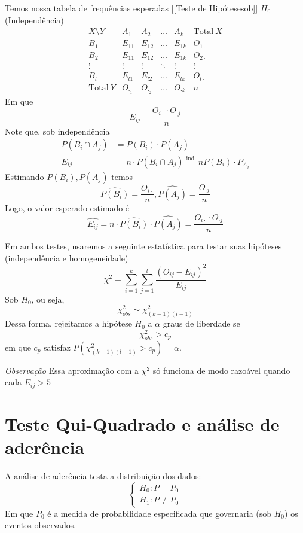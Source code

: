 \documentclass[
  letterpaper,
  DIV=11,
  numbers=noendperiod]{scrreprt}
\begin{document}
Temos nossa tabela de frequências esperadas {[}{[}Teste de
Hipótese\textbar sob{]}{]} \(H_{0}\) (Independência) \[
\begin{array}{c|cccc|c}
X\setminus Y  & A_{1} & A_{2} & \dots & A_{k} & \mathrm{Total}~X \\
\hline
B_{1} & E_{11} & E_{12} & \dots & E_{1k} & O_{1\cdot} \\
B_{2} & E_{11} & E_{12} & \dots & E_{1k} & O_{2\cdot} \\
\vdots & \vdots & \vdots & \ddots & \vdots & \vdots \\
B_{l} & E_{l1} & E_{l2} & \dots & E_{lk} & O_{l\cdot} \\
\hline
\mathrm{Total}~Y  & O_{\cdot_{1}} & O_{\cdot_{2}}  & \dots  & O_{\cdot k}  & n
\end{array}
\] Em que \[
E_{ij} = \frac{O_{i \cdot} \cdot O_{\cdot j}}{n}
\] Note que, sob independência \[
\begin{aligned}
P(B_{i}\cap A_{j}) &= P(B_{i}) \cdot P(A_{j}) \\
E_{ij} &= n \cdot P(B_{i}\cap A_{j}) \stackrel{\mathrm{ind.}}{=} n P(B_{i}) \cdot P_{A_{j}}
\end{aligned}
\] Estimando \(P(B_{i}), P(A_{j})\) temos \[
\widehat{P(B_{i})} = \frac{O_{i\cdot}}{n}, \widehat{P(A_{j})}= \frac{O_{\cdot j}}{n}
\] Logo, o valor esperado estimado é \[
\widehat{E_{ij}}=n \cdot \widehat{P(B_{i})}\cdot\widehat{P(A_{j})} = \frac{O_{i \cdot} \cdot O_{\cdot j}}{n}
\]

Em ambos testes, usaremos a seguinte estatística para testar suas
hipóteses (independência e homogeneidade) \[
\chi^2 = \sum^k_{i=1}\sum^l_{j=1} \frac{(O_{ij}-E_{ij})^2}{E_{ij}}
\] Sob \(H_{0}\), ou seja, \[
\chi^2_{obs}\sim \chi^2_{(k-1)(l-1)}
\] Dessa forma, rejeitamos a hipótese \(H_{0}\) a \(\alpha\) graus de
liberdade se \[
\chi^2_{obs} > c_{p}
\] em que \(c_{p}\) satisfaz \(P(\chi^2_{(k-1)(l-1)} > c_{p})=\alpha\).

\emph{Observação} Essa aproximação com a \(\chi^2\) só funciona de modo
razoável quando cada \(E_{ij}>5\)


\chapter{Teste Qui-Quadrado e análise de
aderência}\label{teste-qui-quadrado-e-anuxe1lise-de-aderuxeancia}

A análise de aderência \href{teste-hipotese.qmd}{testa} a distribuição
dos dados: \[
\begin{cases}
H_{0}: P= P_{0} \\
H_{1}: P \neq P_{0}
\end{cases}
\] Em que \(P_{0}\) é a medida de probabilidade especificada que
governaria (sob \(H_0\)) os eventos observados.
\end{document}
